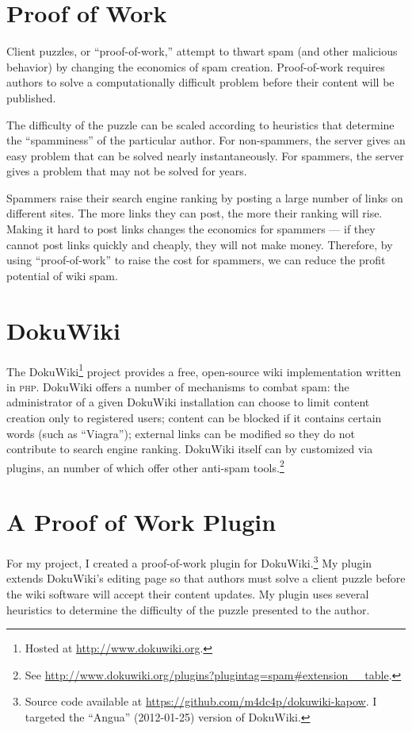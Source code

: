 \documentclass[12pt]{article}
\def\php{\textsc{php}\xspace}
\begin{document}
\section*{Proof of Work}
Client puzzles, or ``proof-of-work,'' attempt to thwart spam (and
other malicious behavior) by changing the economics of spam
creation. Proof-of-work requires authors to solve a
computationally difficult problem before their content will be
published. 

The difficulty of the puzzle can be scaled according to heuristics
that determine the ``spamminess'' of the particular author. For
non-spammers, the server gives an easy problem that can be solved
nearly instantaneously. For spammers, the server gives a problem that
may not be solved for years.

Spammers raise their search engine ranking by posting a large number
of links on different sites. The more links they can post, the more
their ranking will rise. Making it hard to post links changes the
economics for spammers --- if they cannot post links quickly and
cheaply, they will not make money. Therefore, by using
``proof-of-work'' to raise the cost for spammers, we can reduce the
profit potential of wiki spam.

\section*{DokuWiki}
The DokuWiki\footnote{Hosted at \url{http://www.dokuwiki.org}.}
project provides a free, open-source wiki implementation written in
\php. DokuWiki offers a number of mechanisms to combat spam: the
administrator of a given DokuWiki installation can choose to limit
content creation only to registered users; content can be blocked if
it contains certain words (such as ``Viagra''); external links can be
modified so they do not contribute to search engine ranking. DokuWiki
itself can by customized via plugins, an number of which offer other
anti-spam tools.\footnote{See
  \url{http://www.dokuwiki.org/plugins?plugintag=spam#extension__table}.}

\section*{A Proof of Work Plugin}
For my project, I created a proof-of-work plugin for
DokuWiki.\footnote{Source code available at
  \url{https://github.com/m4dc4p/dokuwiki-kapow}. I targeted the
  ``Angua'' (2012-01-25) version of DokuWiki. } My plugin extends
DokuWiki's editing page so that authors must solve a client puzzle
before the wiki software will accept their content updates. My plugin uses
several heuristics to determine the difficulty of the puzzle presented
to the author. 
\end{document}
